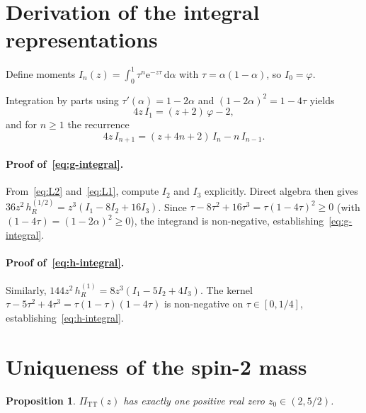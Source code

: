 \documentclass[12pt,a4paper]{article}
\newtheorem{proposition}[theorem]{Proposition}
\newcommand{\PiTT}{\Pi_{\mathrm{TT}}}
\newcommand{\dd}{\mathrm{d}}
\newcommand{\ee}{\mathrm{e}}
\begin{document}
\section{Derivation of the integral representations}
\label{app:integral-proofs}

Define moments $I_n(z) = \int_0^1 \tau^n \ee^{-z\tau}\,\dd\alpha$
with $\tau = \alpha(1-\alpha)$, so $I_0 = \varphi$.

Integration by parts using
$\tau'(\alpha) = 1-2\alpha$ and $(1-2\alpha)^2 = 1 - 4\tau$ yields
\begin{equation}\label{eq:L2}
  4z\,I_1 = (z+2)\,\varphi - 2,
\end{equation}
and for $n \geq 1$ the recurrence
\begin{equation}\label{eq:L1}
  4z\,I_{n+1} = (z + 4n + 2)\,I_n - n\,I_{n-1}.
\end{equation}

\paragraph{Proof of~\eqref{eq:g-integral}.}
From~\eqref{eq:L2} and~\eqref{eq:L1}, compute $I_2$ and $I_3$
explicitly.  Direct algebra then gives
$36z^2\,h_R^{(1/2)} = z^3(I_1 - 8I_2 + 16I_3)$.
Since $\tau - 8\tau^2 + 16\tau^3 = \tau(1-4\tau)^2 \geq 0$
(with $(1-4\tau) = (1-2\alpha)^2 \geq 0$),
the integrand is non-negative, establishing~\eqref{eq:g-integral}.

\paragraph{Proof of~\eqref{eq:h-integral}.}
Similarly, $144z^2\,h_R^{(1)} = 8z^3(I_1 - 5I_2 + 4I_3)$.
The kernel $\tau - 5\tau^2 + 4\tau^3 = \tau(1-\tau)(1-4\tau)$
is non-negative on $\tau \in [0, 1/4]$, establishing~\eqref{eq:h-integral}.


\section{Uniqueness of the spin-2 mass}
\label{app:uniqueness}

\begin{proposition}\label{prop:unique-zero}
$\PiTT(z)$ has exactly one positive real zero $z_0 \in (2, 5/2)$.
\end{proposition}
\end{document}
